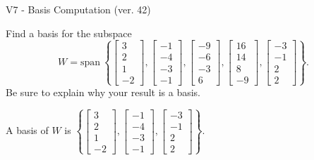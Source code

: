 \begin{exercise}
  \begin{exerciseTitle}V7 - Basis Computation (ver. 42)\end{exerciseTitle}
  \begin{exerciseStatement}
    Find a basis for the subspace 
\[W=\mathrm{span}\ \left\{\left[\begin{array}{r}
3 \\
2 \\
1 \\
-2
\end{array}\right] , \left[\begin{array}{r}
-1 \\
-4 \\
-3 \\
-1
\end{array}\right] , \left[\begin{array}{r}
-9 \\
-6 \\
-3 \\
6
\end{array}\right] , \left[\begin{array}{r}
16 \\
14 \\
8 \\
-9
\end{array}\right] , \left[\begin{array}{r}
-3 \\
-1 \\
2 \\
2
\end{array}\right]\right\}.\]
 Be sure to explain why your result is a basis.


  \end{exerciseStatement}
  \begin{exerciseAnswer}
   A basis of \(W\) is  \(\left\{\left[\begin{array}{r}
3 \\
2 \\
1 \\
-2
\end{array}\right] , \left[\begin{array}{r}
-1 \\
-4 \\
-3 \\
-1
\end{array}\right] , \left[\begin{array}{r}
-3 \\
-1 \\
2 \\
2
\end{array}\right]\right\}\).
  


  \end{exerciseAnswer}
\end{exercise}